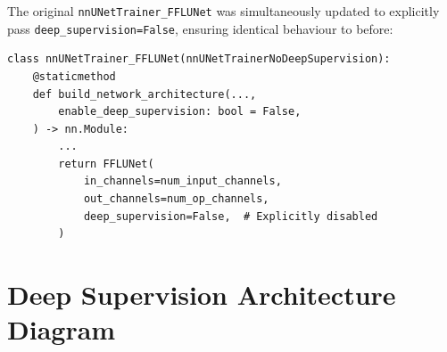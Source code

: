 \documentclass[12pt,a4paper]{report}
\begin{document}
The original \texttt{nnUNetTrainer\_FFLUNet} was simultaneously updated to explicitly pass \texttt{deep\_supervision=False}, ensuring identical behaviour to before:

\begin{lstlisting}[caption={Updated nnUNetTrainer\_FFLUNet preserving original behaviour}, label={lst:orig_trainer}]
class nnUNetTrainer_FFLUNet(nnUNetTrainerNoDeepSupervision):
    @staticmethod
    def build_network_architecture(...,
        enable_deep_supervision: bool = False,
    ) -> nn.Module:
        ...
        return FFLUNet(
            in_channels=num_input_channels,
            out_channels=num_op_channels,
            deep_supervision=False,  # Explicitly disabled
        )
\end{lstlisting}

\section{Deep Supervision Architecture Diagram}
\end{document}

